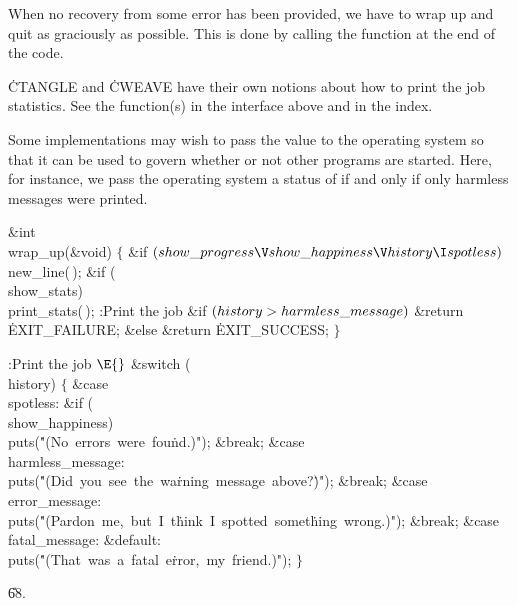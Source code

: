 When no recovery from some error has been provided, we have to wrap
up and quit as graciously as possible.  This is done by calling the
function  at the end of the code.

\.{CTANGLE} and \.{CWEAVE} have their own notions about how to
print the job statistics.  See the function(s)  in the
interface above and in the index.

Some implementations may wish to pass the  value to the
operating system so that it can be used to govern whether or not other
programs are started. Here, for instance, we pass the operating system
a status of  if and only if only harmless messages were
printed.

\Y\B\1\1\&{int} \\{wrap\_up}(\&{void})\2\2\6
${}\{{}$\1\6
\&{if} ${}(\\{show\_progress}\V\\{show\_happiness}\V\\{history}\I%
\\{spotless}){}$\1\5
\\{new\_line}(\,);\2\6
\&{if} (\\{show\_stats})\1\5
\\{print\_stats}(\,);\2\6
:Print the job \X\6
\&{if} ${}(\\{history}>\\{harmless\_message}){}$\1\5
\&{return} \.{EXIT\_FAILURE};\2\6
\&{else}\1\5
\&{return} \.{EXIT\_SUCCESS};\2\6
\4${}\}{}$\2\par
\fi

\B{}:Print the job \X${}\E{}$\6
\&{switch} (\\{history})\5
${}\{{}$\1\6
\4\&{case} \\{spotless}:\6
\&{if} (\\{show\_happiness})\1\5
\\{puts}(\.{"(No\ errors\ were\ fou}\)\.{nd.)"});\2\6
\&{break};\6
\4\&{case} \\{harmless\_message}:\5
\\{puts}(\.{"(Did\ you\ see\ the\ wa}\)\.{rning\ message\ above?}\)\.{)"});\6
\&{break};\6
\4\&{case} \\{error\_message}:\5
\\{puts}(\.{"(Pardon\ me,\ but\ I\ t}\)\.{hink\ I\ spotted\ somet}\)\.{hing\
wrong.)"});\6
\&{break};\6
\4\&{case} \\{fatal\_message}:\5
\&{default}:\5
\\{puts}(\.{"(That\ was\ a\ fatal\ e}\)\.{rror,\ my\ friend.)"});\6
\4${}\}{}$\2\par
\U68.\fi

